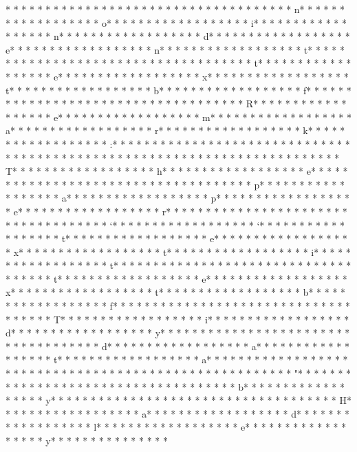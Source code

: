 * * *  * * *  * * *  *  * * *  *  * * *  * 	* * *  * * *  * * *  *  * * *  *  * * *  * n* * *  * * *  * * *  *  * * *  *  * * *  * o* * *  * * *  * * *  *  * * *  *  * * *  * i* * *  * * *  * * *  *  * * *  *  * * *  * n* * *  * * *  * * *  *  * * *  *  * * *  * d* * *  * * *  * * *  *  * * *  *  * * *  * e* * *  * * *  * * *  *  * * *  *  * * *  * n* * *  * * *  * * *  *  * * *  *  * * *  * t* * *  * * *  * * *  *  * * *  *  * * *  *  * * *  * * *  * * *  *  * * *  *  * * *  * t* * *  * * *  * * *  *  * * *  *  * * *  * e* * *  * * *  * * *  *  * * *  *  * * *  * x* * *  * * *  * * *  *  * * *  *  * * *  * t* * *  * * *  * * *  *  * * *  *  * * *  * b* * *  * * *  * * *  *  * * *  *  * * *  * f* * *  * * *  * * *  *  * * *  *  * * *  * {* * *  * * *  * * *  *  * * *  *  * * *  * R* * *  * * *  * * *  *  * * *  *  * * *  * e* * *  * * *  * * *  *  * * *  *  * * *  * m* * *  * * *  * * *  *  * * *  *  * * *  * a* * *  * * *  * * *  *  * * *  *  * * *  * r* * *  * * *  * * *  *  * * *  *  * * *  * k* * *  * * *  * * *  *  * * *  *  * * *  * :* * *  * * *  * * *  *  * * *  *  * * *  * }* * *  * * *  * * *  *  * * *  *  * * *  *  * * *  * * *  * * *  *  * * *  *  * * *  *  * * *  * * *  * * *  *  * * *  *  * * *  * T* * *  * * *  * * *  *  * * *  *  * * *  * h* * *  * * *  * * *  *  * * *  *  * * *  * e* * *  * * *  * * *  *  * * *  *  * * *  *  * * *  * * *  * * *  *  * * *  *  * * *  * p* * *  * * *  * * *  *  * * *  *  * * *  * a* * *  * * *  * * *  *  * * *  *  * * *  * p* * *  * * *  * * *  *  * * *  *  * * *  * e* * *  * * *  * * *  *  * * *  *  * * *  * r* * *  * * *  * * *  *  * * *  *  * * *  *  * * *  * * *  * * *  *  * * *  *  * * *  * `* * *  * * *  * * *  *  * * *  *  * * *  * `* * *  * * *  * * *  *  * * *  *  * * *  * t* * *  * * *  * * *  *  * * *  *  * * *  * e* * *  * * *  * * *  *  * * *  *  * * *  * x* * *  * * *  * * *  *  * * *  *  * * *  * t* * *  * * *  * * *  *  * * *  *  * * *  * i* * *  * * *  * * *  *  * * *  *  * * *  * t* * *  * * *  * * *  *  * * *  *  * * *  * {* * *  * * *  * * *  *  * * *  *  * * *  * t* * *  * * *  * * *  *  * * *  *  * * *  * e* * *  * * *  * * *  *  * * *  *  * * *  * x* * *  * * *  * * *  *  * * *  *  * * *  * t* * *  * * *  * * *  *  * * *  *  * * *  * b* * *  * * *  * * *  *  * * *  *  * * *  * f* * *  * * *  * * *  *  * * *  *  * * *  * {* * *  * * *  * * *  *  * * *  *  * * *  * T* * *  * * *  * * *  *  * * *  *  * * *  * i* * *  * * *  * * *  *  * * *  *  * * *  * d* * *  * * *  * * *  *  * * *  *  * * *  * y* * *  * * *  * * *  *  * * *  *  * * *  *  * * *  * * *  * * *  *  * * *  *  * * *  * d* * *  * * *  * * *  *  * * *  *  * * *  * a* * *  * * *  * * *  *  * * *  *  * * *  * t* * *  * * *  * * *  *  * * *  *  * * *  * a* * *  * * *  * * *  *  * * *  *  * * *  * }* * *  * * *  * * *  *  * * *  *  * * *  * }* * *  * * *  * * *  *  * * *  *  * * *  * "* * *  * * *  * * *  *  * * *  *  * * *  *  * * *  * * *  * * *  *  * * *  *  * * *  * b* * *  * * *  * * *  *  * * *  *  * * *  * y* * *  * * *  * * *  *  * * *  *  * * *  *  * * *  * * *  * * *  *  * * *  *  * * *  * H* * *  * * *  * * *  *  * * *  *  * * *  * a* * *  * * *  * * *  *  * * *  *  * * *  * d* * *  * * *  * * *  *  * * *  *  * * *  * l* * *  * * *  * * *  *  * * *  *  * * *  * e* * *  * * *  * * *  *  * * *  *  * * *  * y* * *  * * *  * * *  *  * * *  *  * 